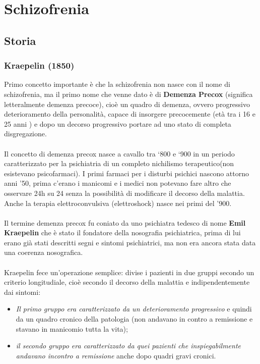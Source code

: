 \section{Schizofrenia}

\subsection{Storia}

\subsubsection{Kraepelin (1850)}

Primo concetto importante è che la schizofrenia non nasce con il nome di
schizofrenia, ma il primo nome che venne dato è di \textbf{Demenza
Precox} (significa letteralmente demenza precoce), cioè un quadro di
demenza, ovvero progressivo deterioramento della personalità, capace di
insorgere precocemente (età tra i 16 e 25 anni ) e dopo un decorso
progressivo portare ad uno stato di completa disgregazione.
\\\\
Il concetto di demenza precox nasce a cavallo tra `800 e `900 in un
periodo caratterizzato per la psichiatria di un completo nichilismo
terapeutico(non esistevano psicofarmaci). I primi farmaci per i disturbi
psichici nascono attorno anni '50, prima c'erano i manicomi e i medici
non potevano fare altro che osservare 24h su 24 senza la possibilità di
modificare il decorso della malattia. Anche la terapia elettroconvulsiva
(elettroshock) nasce nei primi del '900.
\\\\
Il termine demenza precox fu coniato da uno psichiatra tedesco di nome
\textbf{Emil Kraepelin} che è stato il fondatore della nosografia
psichiatrica, prima di lui erano già stati descritti segni e sintomi
psichiatrici, ma non era ancora stata data una coerenza nosografica.
\\\\
Kraepelin fece un'operazione semplice: divise i pazienti in due gruppi
secondo un criterio longitudiale, cioè secondo il decorso della malattia
e indipendentemente dai sintomi:

\begin{itemize}
\item
  \emph{Il primo gruppo era caratterizzato da un deterioramento
  progressivo} e quindi da un quadro cronico della patologia (non
  andavano in contro a remissione e stavano in manicomio tutta la vita);
\item
  \emph{il secondo gruppo era caratterizzato da quei pazienti che
  inspiegabilmente andavano incontro a remissione} anche dopo quadri
  gravi cronici.
\end{itemize}

